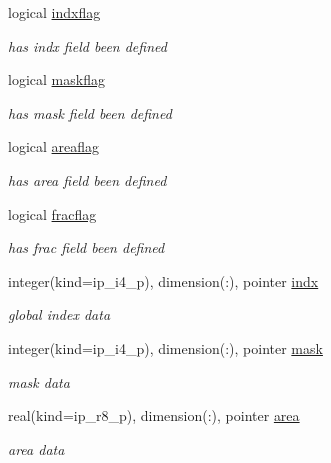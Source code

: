 \begin{DoxyCompactItemize}
logical \hyperlink{structmod__oasis__part_1_1prism__part__type_a8882d67fead7e4843f65c3dfc711cb18}{indxflag}
\begin{DoxyCompactList}\small\item\em has indx field been defined \end{DoxyCompactList}\item 
logical \hyperlink{structmod__oasis__part_1_1prism__part__type_af5364a2d4cedd391abdae414b8a69d47}{maskflag}
\begin{DoxyCompactList}\small\item\em has mask field been defined \end{DoxyCompactList}\item 
logical \hyperlink{structmod__oasis__part_1_1prism__part__type_aca6f14d9776b986665a732b66405e252}{areaflag}
\begin{DoxyCompactList}\small\item\em has area field been defined \end{DoxyCompactList}\item 
logical \hyperlink{structmod__oasis__part_1_1prism__part__type_af4a24cb69c1fcaa0ad62700c63e458ea}{fracflag}
\begin{DoxyCompactList}\small\item\em has frac field been defined \end{DoxyCompactList}\item 
integer(kind=ip\+\_\+i4\+\_\+p), dimension(\+:), pointer \hyperlink{structmod__oasis__part_1_1prism__part__type_a0cfca06ede21cbcbc1884c9c1ca59326}{indx}
\begin{DoxyCompactList}\small\item\em global index data \end{DoxyCompactList}\item 
integer(kind=ip\+\_\+i4\+\_\+p), dimension(\+:), pointer \hyperlink{structmod__oasis__part_1_1prism__part__type_ac18ac2f9bb610cc6d5b2010ddd55104e}{mask}
\begin{DoxyCompactList}\small\item\em mask data \end{DoxyCompactList}\item 
real(kind=ip\+\_\+r8\+\_\+p), dimension(\+:), pointer \hyperlink{structmod__oasis__part_1_1prism__part__type_ad8094acbe70644467444a8af6d0901e8}{area}
\begin{DoxyCompactList}\small\item\em area data \end{DoxyCompactList}\item 

\end{DoxyCompactItemize}
